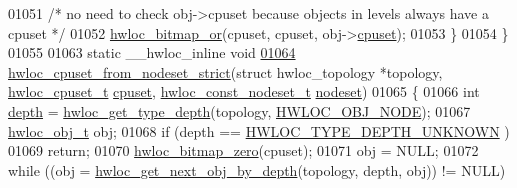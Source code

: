 \begin{DoxyCode}
{{01051                         \textcolor{comment}{/* no need to check obj->cpuset because objects in levels
       always have a cpuset */}
01052                         \hyperlink{a00065_ga1ba1de709ee9a7cf5cc8ad2d9a1a81d4}{hwloc_bitmap_or}(cpuset, cpuset, obj->\hyperlink{a00016_a67925e0f2c47f50408fbdb9bddd0790f}{cpuset});
01053         \}
01054 \}
01055 
01063 \textcolor{keyword}{static} \_\_hwloc\_inline \textcolor{keywordtype}{void}
\hypertarget{a00031_source_l01064}{}\hyperlink{a00062_gaa7c3f39802b00a758c58e024a8119979}{01064} \hyperlink{a00062_gaa7c3f39802b00a758c58e024a8119979}{hwloc_cpuset_from_nodeset_strict}(\textcolor{keyword}{struct} hwloc\_topology *topology, \hyperlink{a00040_ga4bbf39b68b6f568fb92739e7c0ea7801}{hwloc_cpuset_t} 
      \hyperlink{a00016_a67925e0f2c47f50408fbdb9bddd0790f}{cpuset}, \hyperlink{a00040_ga2f5276235841ad66a79bedad16a5a10c}{hwloc_const_nodeset_t} \hyperlink{a00016_a08f0d0e16c619a6e653526cbee4ffea3}{nodeset})
01065 \{
01066         \textcolor{keywordtype}{int} \hyperlink{a00016_a9d82690370275d42d652eccdea5d3ee5}{depth} = \hyperlink{a00046_gaea7c64dd59467f5201ba87712710b14d}{hwloc_get_type_depth}(topology, \hyperlink{a00041_ggacd37bb612667dc437d66bfb175a8dc55aaf0964881117bdedf1a5e9332cd120dd}{HWLOC_OBJ_NODE});
01067         \hyperlink{a00016}{hwloc_obj_t} obj;
01068         \textcolor{keywordflow}{if} (depth == \hyperlink{a00046_ggaf4e663cf42bbe20756b849c6293ef575a0565ab92ab72cb0cec91e23003294aad}{HWLOC_TYPE_DEPTH_UNKNOWN} )
01069                 \textcolor{keywordflow}{return};
01070         \hyperlink{a00065_ga6c540b9fe63b8223b6aba46d56dd63b8}{hwloc_bitmap_zero}(cpuset);
01071         obj = NULL;
01072         \textcolor{keywordflow}{while} ((obj = \hyperlink{a00053_gab7c1dce3f42ece5bfa621e87cf332418}{hwloc_get_next_obj_by_depth}(topology, depth, obj)) != NULL)
      
}}
\end{DoxyCode}

